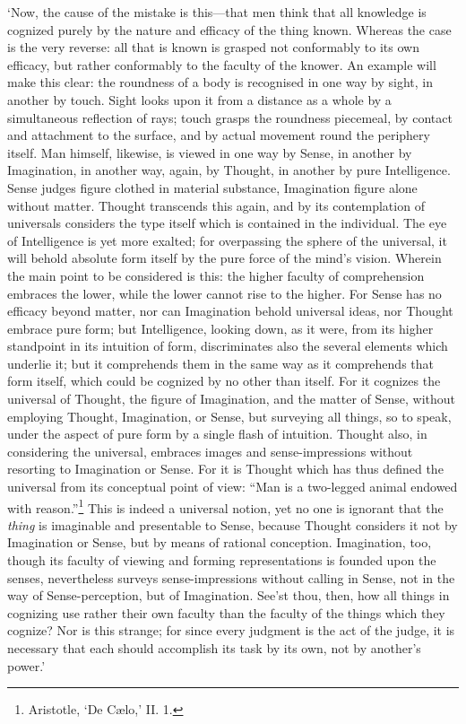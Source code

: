 \documentclass[11pt]{book}
\begin{document}
`Now, the cause of the mistake is this---that men think that all
knowledge is cognized purely by the nature and efficacy of the thing
known. Whereas the case is the very reverse: all that is known is
grasped not conformably to its own efficacy, but rather conformably to
the faculty of the knower. An example will make this clear: the
roundness of a body is recognised in one way by sight, in another by
touch. Sight looks upon it from a distance as a whole by a simultaneous
reflection of rays; touch grasps the roundness piecemeal, by contact and
attachment to the surface, and by actual movement round the periphery
itself. Man himself, likewise, is viewed in one way by Sense, in another
by Imagination, in another way, again, by Thought, in another by pure
Intelligence. Sense judges figure clothed in material substance,
Imagination figure alone without matter. Thought transcends this again,
and by its contemplation of universals considers the type itself which
is contained in the individual. The eye of Intelligence is yet more
exalted; for overpassing the sphere of the universal, it will behold
absolute form itself by the pure force of the mind's vision. Wherein the
main point to be considered is this: the higher faculty of comprehension
embraces the lower, while the lower cannot rise to the higher. For Sense
has no efficacy beyond matter, nor can Imagination behold universal
ideas, nor Thought embrace pure form; but Intelligence, looking down, as
it were, from its higher standpoint in its intuition of form,
discriminates also the several elements which underlie it; but it
comprehends them in the same way as it comprehends that form itself,
which could be cognized by no other than itself. For it cognizes the
universal of Thought, the figure of Imagination, and the matter of
Sense, without employing Thought, Imagination, or Sense, but surveying
all things, so to speak, under the aspect of pure form by a single flash
of intuition. Thought also, in considering the universal, embraces
images and sense-impressions without resorting to Imagination or Sense.
For it is Thought which has thus defined the universal from its
conceptual point of view: ``Man is a two-legged animal endowed with
reason.''\footnote{Aristotle, `De Cælo,’ II. 1.} This is indeed a universal notion, yet no one is ignorant that
the \emph{thing} is imaginable and presentable to Sense, because Thought
considers it not by Imagination or Sense, but by means of rational
conception. Imagination, too, though its faculty of viewing and forming
representations is founded upon the senses, nevertheless surveys
sense-im\-pres\-sions without calling in Sense, not in the way of
Sense-per\-cep\-tion, but of Imagination. See'st thou, then, how all things
in cognizing use rather their own faculty than the faculty of the things
which they cognize? Nor is this strange; for since every judgment is the
act of the judge, it is necessary that each should accomplish its task
by its own, not by another's power.'
\end{document}
